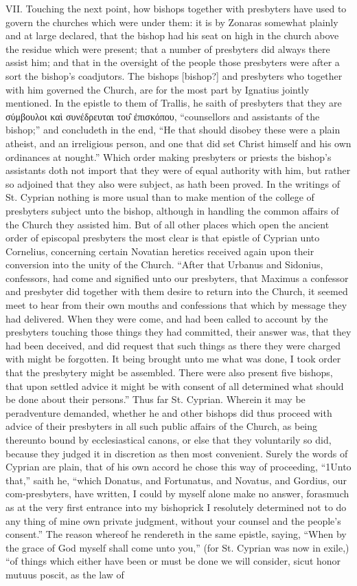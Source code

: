 VII. Touching the next point, how bishops together with presbyters have used to govern the churches which were under them: it is by Zonaras somewhat plainly and at large declared, that the bishop had his seat on high in the church above the residue which were present; that a number of presbyters did always there assist him; and that in the oversight of the people those presbyters were after a sort the bishop’s coadjutors. The bishops [bishop?] and presbyters who together with him governed the Church, are for the most part by Ignatius jointly mentioned. In the epistle to them of Trallis, he saith of presbyters that they are σύμβουλοι καὶ συνέδρευται του̑ ἐπισκόπου, “counsellors and assistants of the bishop;” and  concludeth in the end, “He that should disobey these were a plain atheist, and an irreligious person, and one that did set Christ himself and his own ordinances at nought.” Which order making presbyters or priests the bishop’s assistants doth not import that they were of equal authority with him, but rather so adjoined that they also were subject, as hath been proved. In the writings of St. Cyprian nothing is more usual than to make mention of the college of presbyters subject unto the bishop, although in handling the common affairs of the Church they assisted him. But of all other places which open the ancient order of episcopal presbyters the most clear is that epistle of Cyprian unto Cornelius, concerning certain Novatian heretics received again upon their conversion into the unity of the Church. “After that Urbanus and Sidonius, confessors, had come and signified unto our presbyters, that Maximus a confessor and presbyter did together with them desire to return into the Church, it seemed meet to hear from their own mouths and confessions that which by message they had delivered. When they were come, and had been called to account by the presbyters touching those things they had committed, their answer was, that they had been deceived, and did request that such things as there they were charged with might be forgotten. It being brought unto me what was done, I took order that the presbytery might be assembled. There were also present five bishops, that upon settled advice it might be with consent of all determined what should be done about their persons.”  Thus far St. Cyprian. Wherein it may be peradventure demanded, whether he and other bishops did thus proceed with advice of their presbyters in all such public affairs of the Church, as being thereunto bound by ecclesiastical canons, or else that they voluntarily so did, because they judged it in discretion as then most convenient. Surely the words of Cyprian are plain, that of his own accord he chose this way of proceeding, “1Unto that,” saith he, “which Donatus, and Fortunatus, and Novatus, and Gordius, our com-presbyters, have written, I could by myself alone make no answer, forasmuch as at the very first entrance into my bishoprick I resolutely determined not to do any thing of mine own private judgment, without your counsel and the people’s consent.” The reason whereof he rendereth in the same epistle, saying, “When by the grace of God myself shall come unto you,” (for St. Cyprian was now in exile,) “of things which either have been or must be done we will consider, sicut honor mutuus poscit, as the law of 